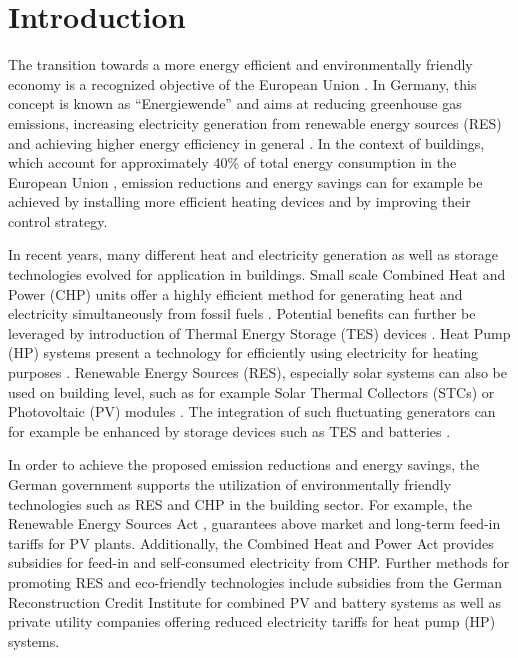 \section{Introduction}

The transition towards a more energy efficient and environmentally friendly economy is a recognized objective of the European Union \cite{TheEuropeanParliamentandtheCouncil2010}.
In Germany, this concept is known as ``Energiewende'' and aims at reducing greenhouse gas emissions, increasing electricity generation from renewable energy sources (RES) and achieving higher energy efficiency in general \cite{FederalMinistryforEconomicAffairsandEnergy2012}. 
In the context of buildings, which account for approximately 40\% of total energy consumption in the European Union \cite{TheEuropeanParliamentandtheCouncil2010}, emission reductions and energy savings can for example be achieved by installing more efficient heating devices and by improving their control strategy.

In recent years, many different heat and electricity generation as well as storage technologies evolved for application in buildings.
Small scale Combined Heat and Power (CHP) units offer a highly efficient method for generating heat and electricity simultaneously from fossil fuels \cite{Maghanki2013,Peacock2005}.
Potential benefits can further be leveraged by introduction of Thermal Energy Storage (TES) devices \cite{Haeseldonckx2007}.
Heat Pump (HP) systems present a technology for efficiently using electricity for heating purposes \cite{Staffell2012}.
Renewable Energy Sources (RES), especially solar systems can also be used on building level, such as for example Solar Thermal Collectors (STCs) \cite{Kalogirou2004} or Photovoltaic (PV) modules \cite{Parida2011}.
The integration of such fluctuating generators can for example be enhanced by storage devices such as TES \cite{Tian2013} and batteries \cite{Luthander2015}.

In order to achieve the proposed emission reductions and energy savings, the German government supports the utilization of environmentally friendly technologies such as RES and CHP in the building sector.
For example, the Renewable Energy Sources Act \cite{EEG2014}, guarantees above market and long-term feed-in tariffs for PV plants.
Additionally, the Combined Heat and Power Act \cite{KWKG2016} provides subsidies for feed-in and self-consumed electricity from CHP.
Further methods for promoting RES and eco-friendly technologies include subsidies from the German Reconstruction Credit Institute for combined PV and battery systems \cite{KfW275_2016} as well as private utility companies offering reduced electricity tariffs for heat pump (HP) systems.

